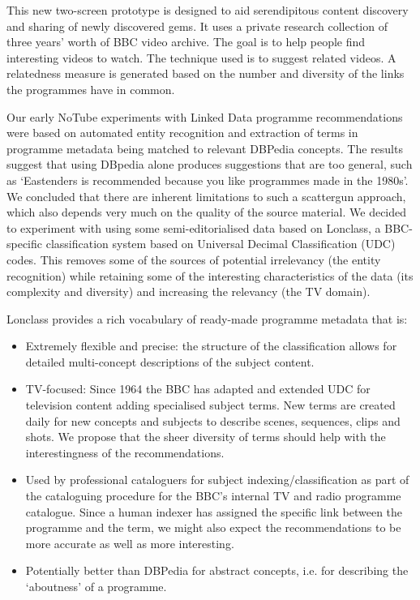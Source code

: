 \documentclass{notube}
\begin{document}
This new two-screen prototype is designed to aid serendipitous content discovery and sharing of newly discovered gems. It uses a private research collection of three years' worth of BBC video archive. The goal is to help people find interesting videos to watch. The technique used is to suggest related videos. A relatedness measure is generated based on the number and diversity of the links the programmes have in common.

Our early NoTube experiments with Linked Data programme recommendations were based on automated entity recognition and extraction of terms in programme metadata being matched to relevant DBPedia concepts. The results suggest that using DBpedia alone produces suggestions that are too general, such as `Eastenders is recommended because you like programmes made in the 1980s'. We concluded that there are inherent limitations to such a scattergun approach, which also depends very much on the quality of the source material.  We decided to experiment with using some semi-editorialised data based on Lonclass, a BBC-specific classification system based on Universal Decimal Classification (UDC) codes. This removes some of the sources of potential irrelevancy (the entity recognition) while retaining some of the interesting characteristics of the data (its complexity and diversity) and increasing the relevancy (the TV domain). 

Lonclass provides a rich vocabulary of ready-made programme metadata that is:

\begin{itemize}
\item{Extremely flexible and precise: the structure of the classification allows for detailed multi-concept descriptions of the subject content.}
\item{TV-focused: Since 1964 the BBC has adapted and extended UDC for television content adding specialised subject terms. New terms are created daily for new concepts and subjects to describe scenes, sequences, clips and shots. We propose that the sheer diversity of terms should help with the interestingness of the recommendations.}
\item{Used by professional cataloguers for subject indexing/classification as part of the cataloguing procedure for the BBC's internal TV and radio programme catalogue. Since a human indexer has assigned the specific link between the programme and the term, we might also expect the recommendations to be more accurate as well as more interesting. }
\item{Potentially better than DBPedia for abstract concepts, i.e. for describing the `aboutness' of a programme.}
\end{itemize}
\end{document}
